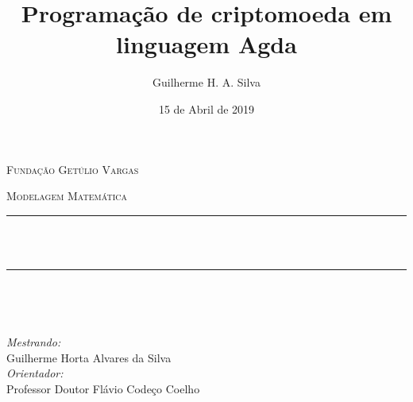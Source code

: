 \documentclass[12pt]{article}
\title{Programação de criptomoeda em linguagem Agda}
\author{Guilherme H. A. Silva}
\date{15 de Abril de 2019}
\makeatletter
\let\thetitle\@title
\makeatother
\begin{document}

\begin{titlepage}
	\centering
    \vspace*{0.5 cm}
   \begin{center}    \textsc{\Large   Fundação Getúlio Vargas}\\[2.0 cm]	\end{center}%
   \textsc{\Large Modelagem Matemática  }\\[0.5 cm]				%
	\rule{\linewidth}{0.2 mm} \\[0.4 cm]
	{ \huge \bfseries \thetitle}\\
	\rule{\linewidth}{0.2 mm} \\[1.5 cm]
	
	\begin{minipage}{0.4\textwidth}
		\begin{flushleft} \large
			\end{flushleft}
			\end{minipage}~
			\begin{minipage}{0.4\textwidth}
            
			\begin{flushright} \large
        \emph{Mestrando:} \\
        Guilherme Horta Alvares da Silva \\
        \emph{Orientador:} \\
        Professor Doutor Flávio Codeço Coelho
		\end{flushright}
           
	\end{minipage}\\[2 cm]

    
    
    
    
	
\end{titlepage}

\end{document}

